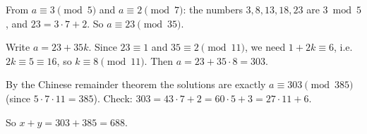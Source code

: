 From $a\equiv3\pmod5$ and $a\equiv2\pmod7$: the numbers $3,8,13,18,23$ are $3\bmod5$, and $23=3\cdot7+2$. So $a\equiv23\pmod{35}$.

Write $a=23+35k$. Since $23\equiv1$ and $35\equiv2\pmod{11}$, we need $1+2k\equiv6$, i.e. $2k\equiv5\equiv16$, so $k\equiv8\pmod{11}$. Then $a=23+35\cdot8=303$.

By the Chinese remainder theorem the solutions are exactly $a\equiv303\pmod{385}$ (since $5\cdot7\cdot11=385$). Check: $303=43\cdot7+2=60\cdot5+3=27\cdot11+6$.

So $x+y=303+385=\boxed{688}$.
